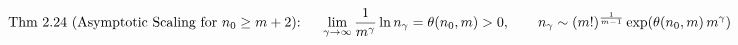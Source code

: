\documentclass[preview]{standalone}
\begin{document}
\begin{align*}
\special{dvisvgm:raw <g id='unique000'>}\text{Thm 2.24 (Asymptotic Scaling for }n_0\ge m+2\text{): }\quad \lim_{\gamma\to\infty} \frac{1}{m^\gamma}\ln n_\gamma = \theta(n_0, m) > 0, \qquad n_\gamma \sim (m!)^{\frac{1}{m-1}} \exp\!\left(\theta(n_0, m)\, m^\gamma\right)\special{dvisvgm:raw </g>}
\end{align*}
\end{document}
